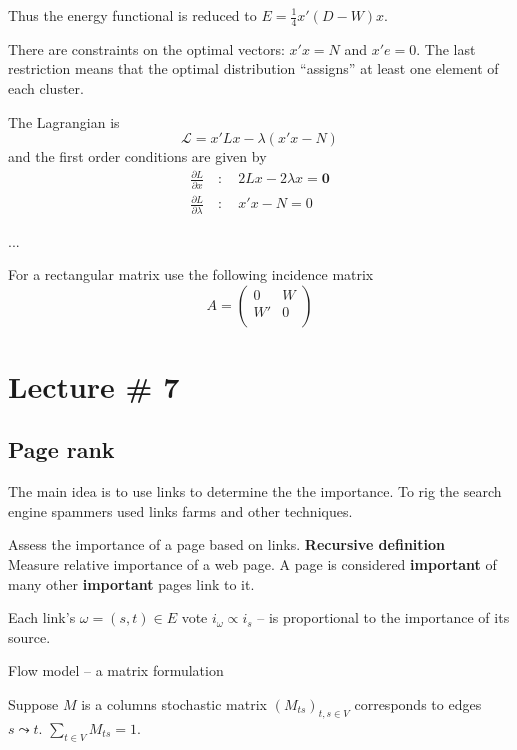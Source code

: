 \documentclass[a4paper]{article}
\newcommand{\brac}[1]{{\left ( #1 \right )}}
\begin{document}
Thus the energy functional is reduced to $E = \frac{1}{4} x' ( D - W ) x $.

There are constraints on the optimal vectors: $x'x = N$ and $x'e = 0$. The last restriction means that the optimal distribution ``assigns'' at least one element of each cluster.

The Lagrangian is 
\[\mathcal{L} = x'Lx - \lambda ( x'x - N )\]
and the first order conditions are given by
\begin{align*}
	\frac{\partial L}{\partial x} \quad:\quad 2Lx - 2\lambda x = \mathbf{0}\\
	\frac{\partial L}{\partial \lambda} \quad:\quad x'x - N = 0
\end{align*} 

...

For a rectangular matrix use the following incidence matrix
\[A = \left(\begin{matrix}
	0&W\\
	W'&0\\
\end{matrix}\right)\]



\section{Lecture \# 7} %
\label{sec:lecture_7}

\subsection{Page rank} %
\label{sub:page_rank}

The main idea is to use links to determine the the importance.
To rig the search engine spammers used links farms and other techniques.

Assess the importance of a page based on links.
\noindent \textbf{Recursive definition}\hfill\\
Measure relative importance of a web page. A page is considered \textbf{important} of many other \textbf{important} pages link to it.

Each link's $\omega = (s,t)\in E$ vote $i_\omega \propto i_s$ -- is proportional to the importance of its source.

Flow model -- a matrix formulation

Suppose $M$ is a columns stochastic matrix $\brac{M_{ts}}_{t,s\in V}$ corresponds to edges $s\leadsto t$.
$\sum_{t\in V}M_{ts} = 1$.
\end{document}
